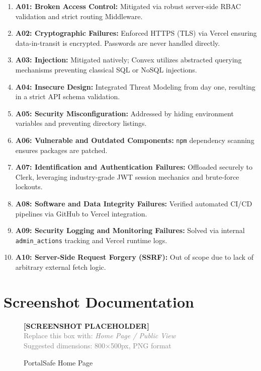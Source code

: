 \documentclass[12pt,a4paper]{report}
\begin{document}
\begin{enumerate}
    \item \textbf{A01: Broken Access Control:} Mitigated via robust server-side RBAC validation and strict routing Middleware.
    \item \textbf{A02: Cryptographic Failures:} Enforced HTTPS (TLS) via Vercel ensuring data-in-transit is encrypted. Passwords are never handled directly.
    \item \textbf{A03: Injection:} Mitigated natively; Convex utilizes abstracted querying mechanisms preventing classical SQL or NoSQL injections.
    \item \textbf{A04: Insecure Design:} Integrated Threat Modeling from day one, resulting in a strict API schema validation.
    \item \textbf{A05: Security Misconfiguration:} Addressed by hiding environment variables and preventing directory listings. 
    \item \textbf{A06: Vulnerable and Outdated Components:} \texttt{npm} dependency scanning ensures packages are patched.
    \item \textbf{A07: Identification and Authentication Failures:} Offloaded securely to Clerk, leveraging industry-grade JWT session mechanics and brute-force lockouts.
    \item \textbf{A08: Software and Data Integrity Failures:} Verified automated CI/CD pipelines via GitHub to Vercel integration.
    \item \textbf{A09: Security Logging and Monitoring Failures:} Solved via internal \texttt{admin\_actions} tracking and Vercel runtime logs.
    \item \textbf{A10: Server-Side Request Forgery (SSRF):} Out of scope due to lack of arbitrary external fetch logic.
\end{enumerate}

\chapter{Screenshot Documentation}

\begin{figure}[H]
  \centering
  \begin{mdframed}[backgroundcolor=lightgray, linecolor=accentblue, linewidth=1.5pt]
    \centering
    \vspace{1.5cm}
    \textbf{\large [SCREENSHOT PLACEHOLDER]}\\[0.5em]
    \textcolor{gray}{Replace this box with: \textit{Home Page / Public View}}\\[0.3em]
    \textcolor{gray}{Suggested dimensions: 800×500px, PNG format}
    \vspace{1.5cm}
  \end{mdframed}
  \caption{PortalSafe Home Page}
\end{figure}
\end{document}

